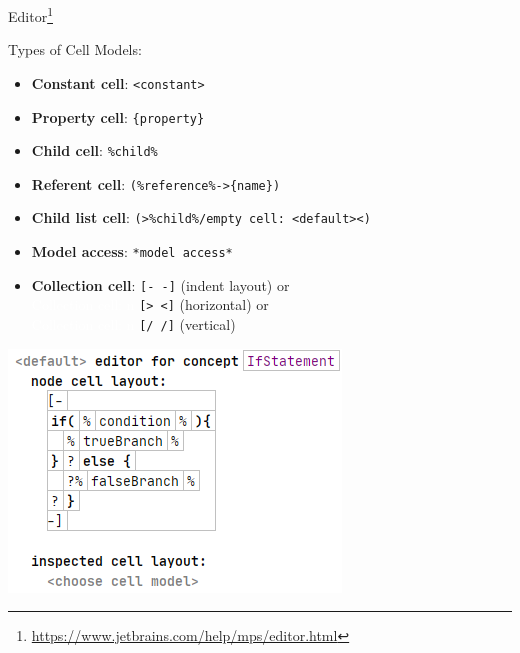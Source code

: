 	\begin{frame}{Editor\footnote{\url{https://www.jetbrains.com/help/mps/editor.html}}}
		\begin{minipage}{0.52\textwidth}
			Types of Cell Models:
			\begin{itemize}
				\item \textbf{Constant cell}: \texttt{<constant>}
				\item \textbf{Property cell}: \texttt{\{property\}}
				\item \textbf{Child cell}: \texttt{\%child\%}
				\item \textbf{Referent cell}: \texttt{(\%reference\%->\{name\})}
				\item \textbf{Child list cell}: \texttt{(>\%child\%/empty cell: <default><)}
				\item \textbf{Model access}: \texttt{*model access*}
				\item \textbf{Collection cell}: \texttt{[- -]} (indent layout) or \\
				\textcolor{white}{Collection cell: n} \texttt{[> <]} (horizontal) or \\
				\textcolor{white}{Collection cell: n} \texttt{[/ /]} (vertical) 
			\end{itemize}
		\end{minipage}
		\begin{minipage}{0.4\textwidth}
			\includegraphics[height=0.8\textheight]{illustrations/editor.png}
		\end{minipage}
	\end{frame}

